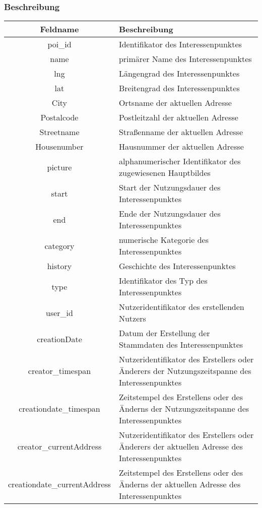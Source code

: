 \subsubsection{Beschreibung}
\begin{longtable}[H]{|c|p{11cm}|}
	\hline
	\textbf{Feldname} & \textbf{Beschreibung} \\ \hline
	poi\_id & Identifikator des Interessenpunktes \\ \hline
	name & primärer Name des Interessenpunktes \\ \hline
	lng & Längengrad des Interessenpunktes \\ \hline
	lat & Breitengrad des Interessenpunktes \\ \hline
	City & Ortsname der aktuellen Adresse \\ \hline
	Postalcode & Postleitzahl der aktuellen Adresse \\ \hline
	Streetname & Straßenname der aktuellen Adresse \\ \hline
	Housenumber & Hausnummer der aktuellen Adresse \\ \hline
	picture & alphanumerischer Identifikator des zugewiesenen Hauptbildes \\ \hline
	start & Start der Nutzungsdauer des Interessenpunktes \\ \hline
	end & Ende der Nutzungsdauer des Interessenpunktes \\ \hline
	category & numerische Kategorie des Interessenpunktes \\ \hline
	history & Geschichte des Interessenpunktes \\ \hline
	type & Identifikator des Typ des Interessenpunktes \\ \hline
	user\_id & Nutzeridentifikator des erstellenden Nutzers \\ \hline
	creationDate & Datum der Erstellung der Stammdaten des Interessenpunktes \\ \hline
	creator\_timespan & Nutzeridentifikator des Erstellers oder Änderers der Nutzungszeitspanne des Interessenpunktes \\ \hline
	creationdate\_timespan & Zeitstempel des Erstellens oder des Änderns der Nutzungszeitspanne des Interessenpunktes \\ \hline
	creator\_currentAddress & Nutzeridentifikator des Erstellers oder Änderers der aktuellen Adresse des Interessenpunktes \\ \hline
	creationdate\_currentAddress & Zeitstempel des Erstellens oder des Änderns der aktuellen Adresse des Interessenpunktes \\ \hline

\end{longtable}
